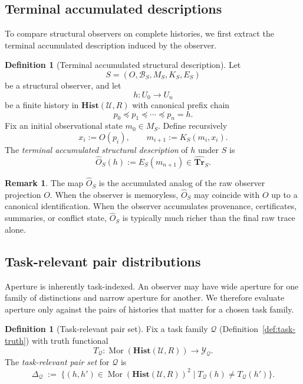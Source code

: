 \documentclass[11pt,twoside]{article}
\theoremstyle{definition}
\newtheorem{definition}[theorem]{Definition}
\newtheorem{remark}[theorem]{Remark}
\newcommand{\Hist}{\mathbf{Hist}}
\newcommand{\Tr}{\mathbf{Tr}}
\DeclareMathOperator{\Mor}{Mor}
\begin{document}
\subsection{Terminal accumulated descriptions}
\label{subsec:terminal-accumulated-descriptions}

To compare structural observers on complete histories, we first extract the terminal accumulated description induced by the observer.

\begin{definition}[Terminal accumulated structural description]
\label{def:terminal-accumulated-description}
Let
\[
  S=(O,\mathcal{B}_S,M_S,K_S,E_S)
\]
be a structural observer, and let
\[
  h : U_0 \to U_n
\]
be a finite history in \(\Hist(\mathcal{U},R)\) with canonical prefix chain
\[
  p_0 \preceq p_1 \preceq \cdots \preceq p_n = h.
\]
Fix an initial observational state \(m_0 \in M_S\).
Define recursively
\[
  x_i := O(p_i), \qquad
  m_{i+1} := K_S(m_i,x_i).
\]
The \emph{terminal accumulated structural description} of \(h\) under \(S\) is
\[
  \widehat{O}_S(h) := E_S(m_{n+1}) \in \widehat{\Tr}_S.
\]
\end{definition}

\begin{remark}
\label{rem:terminal-acc-desc}
The map \(\widehat{O}_S\) is the accumulated analog of the raw observer projection \(O\). When the observer is memoryless, \(\widehat{O}_S\) may coincide with \(O\) up to a canonical identification. When the observer accumulates provenance, certificates, summaries, or conflict state, \(\widehat{O}_S\) is typically much richer than the final raw trace alone.
\end{remark}

\subsection{Task-relevant pair distributions}
\label{subsec:task-relevant-pair-distributions}

Aperture is inherently task-indexed. An observer may have wide aperture for one family of distinctions and narrow aperture for another. We therefore evaluate aperture only against the pairs of histories that matter for a chosen task family.

\begin{definition}[Task-relevant pair set]
\label{def:task-relevant-pair-set}
Fix a task family \(\mathcal{Q}\) (Definition~\ref{def:task-truth}) with truth functional
\[
  T_{\mathcal{Q}} : \Mor(\Hist(\mathcal{U},R)) \to \mathcal{Y}_{\mathcal{Q}}.
\]
The \emph{task-relevant pair set} for \(\mathcal{Q}\) is
\[
  \Delta_{\mathcal{Q}}
  \;:=\;
  \bigl\{
    (h,h') \in \Mor(\Hist(\mathcal{U},R))^2
    \;\big|\;
    T_{\mathcal{Q}}(h) \neq T_{\mathcal{Q}}(h')
  \bigr\}.
\]
\end{definition}
\end{document}
